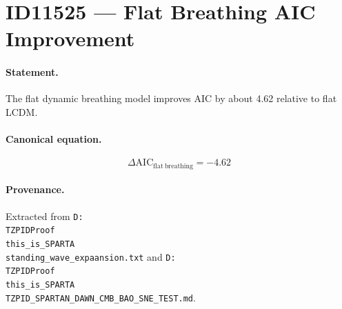\section*{ID11525 --- Flat Breathing AIC Improvement}

\paragraph{Statement.}
The flat dynamic breathing model improves AIC by about 4.62 relative to flat LCDM.

\paragraph{Canonical equation.}
\[
\Delta\mathrm{AIC}_{\mathrm{flat\ breathing}}=-4.62
\]

\paragraph{Provenance.}
Extracted from \texttt{D:\\TZPIDProof\\this\_is\_SPARTA\\standing\_wave\_expaansion.txt} and \texttt{D:\\TZPIDProof\\this\_is\_SPARTA\\TZPID\_SPARTAN\_DAWN\_CMB\_BAO\_SNE\_TEST.md}.
